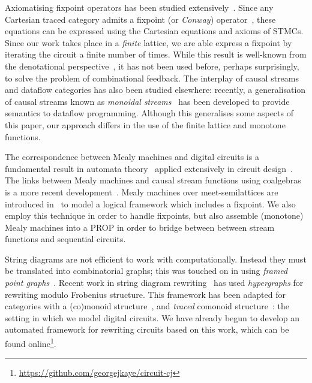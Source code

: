 \documentclass{lmcs}
\begin{document}
Axiomatising fixpoint operators has been studied
extensively~\cite{bloom1993iteration,stefanescu2000network,simpson2000complete}.
Since any Cartesian traced category admits a fixpoint (or \emph{Conway})
operator~\cite{hasegawa1997recursion}, these equations can be expressed using
the Cartesian equations and axioms of STMCs.
Since our work takes place in a \emph{finite} lattice, we are able express a
fixpoint by iterating the circuit a finite number of times.
While this result is well-known from the denotational
perspective~\cite{stoltenberg-hansen1994mathematical}, it has not been used
before, perhaps surprisingly, to solve the problem of combinational feedback.
The interplay of causal streams and dataflow categories has also been studied
elsewhere: recently, a generalisation of causal streams known as
\emph{monoidal streams}~\cite{dilavore2022monoidala} has been developed to
provide semantics to dataflow programming.
Although this generalises some aspects of this paper, our approach differs in
the use of the finite lattice and monotone functions.

The correspondence between Mealy machines and digital circuits is a fundamental
result in automata theory~\cite{mealy1955method} applied extensively in circuit
design~\cite{kohavi2009switching}.
The links between Mealy machines and causal stream functions using coalgebras is
a more recent
development~\cite{rutten2005coinductive,rutten2005algebra,rutten2006algebraic}.
Mealy machines over meet-semilattices are introduced
in~\cite{bonsangue2008coalgebraic} to model a logical framework which includes
a fixpoint.
We also employ this technique in order to handle fixpoints, but also assemble
(monotone) Mealy machines into a PROP in order to bridge between
between stream functions and sequential circuits.

String diagrams are not efficient to work with computationally.
Instead they must be translated into combinatorial graphs; this was touched on
in \cite{ghica2017diagrammatic} using
\emph{framed point graphs}~\cite{kissinger2012pictures}.
Recent work in string diagram
rewriting~\cite{bonchi2022string,bonchi2022stringa,bonchi2022stringb} has used
\emph{hypergraphs} for rewriting modulo Frobenius structure.
This framework has been adapted for categories with a (co)monoid
structure~\cite{fritz2023free,milosavljevic2023string}, and \emph{traced}
comonoid structure~\cite{ghica2023rewriting}: the setting in which we model
digital circuits.
We have already begun to develop an automated framework for rewriting
circuits based on this work, which can be found
online\footnote{\url{https://github.com/georgejkaye/circuit-cj}}.



\end{document}

